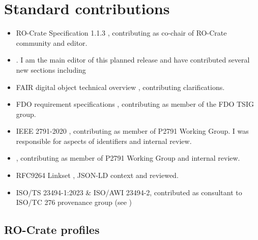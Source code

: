 \section{Standard contributions}
\begin{itemize}
  \item RO-Crate Specification 1.1.3 \cite{RO-Crate 1.1.3}, contributing as co-chair of RO-Crate community and editor.
  \item {} \cite{RO-Crate 1.2}. I am the main editor of this planned release and have contributed several new sections including 
  \item FAIR digital object technical overview \cite{Ivonne 2023}, contributing clarifications.
  \item FDO requirement specifications \cite{Anders 2023}, contributing as member of the FDO TSIG group.
  \item IEEE 2791-2020 \cite{IEEE 2791-2020}, contributing as member of P2791 Working Group. I was responsible for aspects of identifiers and internal review.
  \item {}, contributing as member of P2791 Working Group and internal review.
  \item RFC9264 Linkset \cite{Wilde 2020},  JSON-LD context and reviewed.
  \item ISO/TS 23494-1:2023 \& ISO/AWI 23494-2, contributed as consultant to ISO/TC 276 provenance group (see \cite{Wittner 2020,Wittner 2023a,Wittner 2023b})
\end{itemize}

\subsection{RO-Crate profiles}

